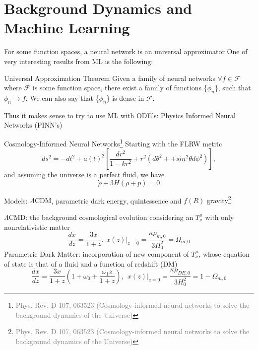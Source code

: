 \documentclass[aspectratio=169, 12pt]{beamer}
\newcommand{\gray}[1]{\textcolor{gray}{#1}}
\begin{document}
\section{Background Dynamics and Machine Learning}
\begin{frame}{For some function spaces, a neural network is an universal approximator}
One of very interesting results from ML is the following:\pause
\begin{block}{\alert{Universal Approximation Theorem}}
Given a family of neural networks $\forall f\in \mathcal{F}$ where $\mathcal{F}$ is some function space, there exist a family of functions \{$\phi_n$\}, such that $\phi_n\rightarrow f$. We can also say that \{$\phi_n$\} is dense in $\mathcal{F}$.\pause
\end{block}
\alert{Thus it makes sense to try to use ML with ODE's: Physics Informed Neural Networks (PINN's)}
\end{frame}
\begin{frame}{Cosmology-Informed Neural Networks\footnote{\tiny{\gray{Phys. Rev. D 107, 063523 (Cosmology-informed neural networks to solve the background dynamics of the Universe)}}}}
Starting with the FLRW metric
\begin{displaymath}
ds^2  = -dt^2 +a(t)^2\left[ \frac{dr^2}{1-kr^2} + r^2(d\theta^2+ +sin^2\theta d\phi^2)\right],
\end{displaymath}
and assuming the universe is a perfect fluid, we have
\begin{displaymath}
\dot{\rho} + 3H(\rho + p) = 0
\end{displaymath}
\end{frame}
\begin{frame}{Models: \alert{$\Lambda$CDM}, \alert{parametric dark energy}, \alert{quintessence}  and \alert{$f(R)$ gravity}\footnote{\tiny{\gray{Phys. Rev. D 107, 063523 (Cosmology-informed neural networks to solve the background dynamics of the Universe)}}}}

\alert{$\Lambda$CMD:} the background cosmological evolution considering an $T^{\mu}_{\nu}$ with only nonrelativistic matter\pause
\begin{displaymath}
  \frac{dx}{dz} = \frac{3x}{1+z}, \ x(z)|_{z=0} = \frac{\kappa\rho_{m,0}}{3H_0^2}=\Omega_{m,0}
\end{displaymath}
\pause
\alert{Parametric Dark Matter:} incorporation of new component of $T^{\mu}_{\nu}$, whose equation of state is that of a fluid and a function of redshift (\alert{DM})\pause
	\begin{displaymath}
  	\frac{dx}{dz} = \frac{3x}{1+z}\left( 1+\omega_0 + \frac{\omega_1 z}{1+z}\right), \ \ x(z)|_{z=0} = \frac{\kappa\rho_{DE,0}}{3H_0^2} = 1-\Omega_{m,0}
	\end{displaymath}

\end{frame}
\end{document}
